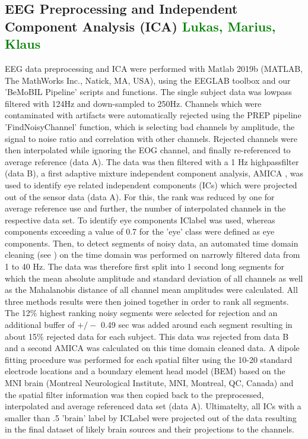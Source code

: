 \subsection{EEG Preprocessing and Independent Component Analysis (ICA) \textcolor{green}{Lukas, Marius, Klaus}}
EEG data preprocessing and ICA were performed with Matlab 2019b (MATLAB, The MathWorks Inc., Natick, MA, USA), using the EEGLAB toolbox \cite{Delorme2004a} and our 'BeMoBIL Pipeline' scripts and functions. The single subject data was lowpass filtered with 124Hz and down-sampled to 250Hz. Channels which were contaminated with artifacts were automatically rejected using the PREP pipeline \cite{Bigdely-Shamlo2015} 'FindNoisyChannel' function, which is selecting bad channels by amplitude, the signal to noise ratio and correlation with other channels. Rejected channels were then interpolated while ignoring the EOG channel, and finally re-referenced to average reference (data A). The data was then filtered with a 1 Hz highpassfilter (data B), a first adaptive mixture independent component analysis, AMICA \cite{Palmer2011}, was used to identify eye related independent components (ICs) which were projected out of the sensor data (data A). For this, the rank was reduced by one for average reference use and further, the number of interpolated channels in the respective data set. To identify eye components IClabel  \cite{Pion-Tonachini2019} was used, whereas components exceeding a value of 0.7 for the 'eye' class were defined as eye components. Then, to detect segments of noisy data, an automated time domain cleaning (see \citet{Gramann2018}) on the time domain was performed on narrowly filtered data from 1 to 40 Hz. The data was therefore first split into 1 second long segments for which the mean absolute amplitude and standard deviation of all channels as well as the Mahalanobis distance of all channel mean amplitudes were calculated. All three methods results were then joined together in order to rank all segments. The 12\% highest ranking noisy segments were selected for rejection and an additional buffer of $+/-$ 0.49 sec was added around each segment resulting in about 15\% rejected data for each subject. This data was rejected from data B and a second AMICA was calculated on this time domain cleaned data. A dipole fitting procedure was performed for each spatial filter using the 10-20 standard electrode locations and a boundary element head model (BEM) based on the MNI brain (Montreal Neurological Institute, MNI, Montreal, QC, Canada) and the spatial filter information was then copied back to the preprocessed, interpolated and average referenced data set (data A). Ultimatelty, all ICs with a smaller than .5 'brain' label by ICLabel were projected out of the data resulting in the final dataset of likely brain sources and their projections to the channels.

